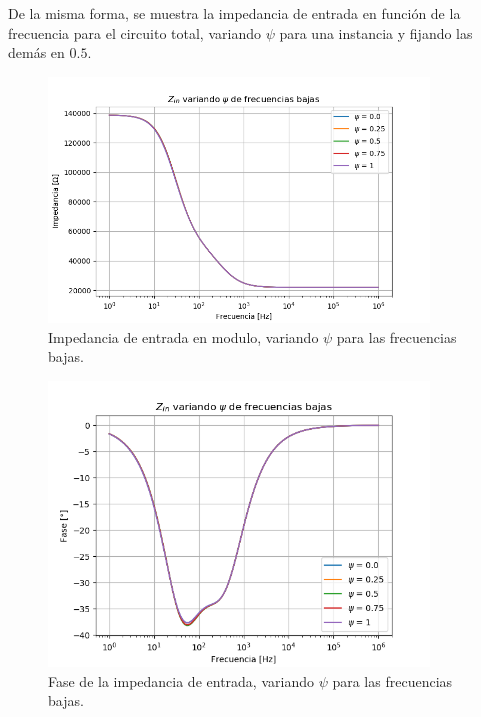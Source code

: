 \documentclass[a4paper]{article}
\begin{document}
De la misma forma, se muestra la impedancia de entrada en función de la frecuencia para el circuito total, variando $\psi$ para una instancia y fijando las demás en $0.5$.
\begin{figure}[H]
\centering
	\includegraphics[width=0.9\textwidth, trim = {0 0 0 1.35cm}, clip]{Imagenes/Zin-Low-Mod.png}
	\caption{Impedancia de entrada en modulo, variando $\psi$ para las frecuencias bajas.}
	\label{fig:zin_modulo_low}
\end{figure}
\begin{figure}[H]
\centering
	\includegraphics[width=0.9\textwidth, trim = {0 0 0 1.35cm}, clip]{Imagenes/Zin-Low-Ph.png}
	\caption{Fase de la impedancia de entrada, variando $\psi$ para las frecuencias bajas.}
	\label{fig:zin_ph_low}
\end{figure}
\end{document}

